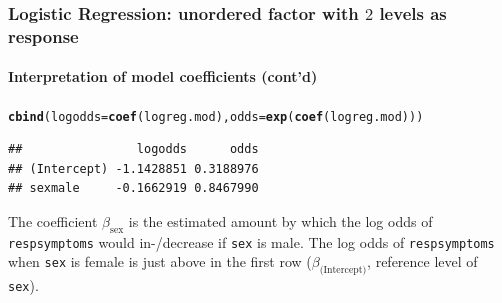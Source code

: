 \documentclass{beamer}\usepackage[]{graphicx}\usepackage[]{color}
\makeatletter
\newcommand{\hlstd}[1]{\textcolor[rgb]{0.345,0.345,0.345}{#1}}%
\newcommand{\hlkwc}[1]{\textcolor[rgb]{0.333,0.667,0.333}{#1}}%
\newcommand{\hlkwd}[1]{\textcolor[rgb]{0.737,0.353,0.396}{\textbf{#1}}}%
\newenvironment{kframe}{%
 \def\at@end@of@kframe{}%
 \ifinner\ifhmode%
  \def\at@end@of@kframe{\end{minipage}}%
  \begin{minipage}{\columnwidth}%
 \fi\fi%
 \def\FrameCommand##1{\hskip\@totalleftmargin \hskip-\fboxsep
 \colorbox{shadecolor}{##1}\hskip-\fboxsep
     \hskip-\linewidth \hskip-\@totalleftmargin \hskip\columnwidth}%
 \MakeFramed {\advance\hsize-\width
   \@totalleftmargin\z@ \linewidth\hsize
   \@setminipage}}%
 {\par\unskip\endMakeFramed%
 \at@end@of@kframe}
\newenvironment{knitrout}{}{} %
\makeatother
\begin{document}
{{{
\begin{frame}[fragile]
\frametitle{Logistic Regression: unordered factor with $2$ levels as response}
\framesubtitle{Interpretation of model coefficients (cont'd)}
\begin{knitrout}\tiny
{}\color{fgcolor}\begin{kframe}
\begin{alltt}
\hlkwd{cbind}\hlstd{(}\hlkwc{logodds} \hlstd{=} \hlkwd{coef}\hlstd{(logreg.mod),} \hlkwc{odds} \hlstd{=} \hlkwd{exp}\hlstd{(}\hlkwd{coef}\hlstd{(logreg.mod)))}
\end{alltt}
\begin{verbatim}
##                logodds      odds
## (Intercept) -1.1428851 0.3188976
## sexmale     -0.1662919 0.8467990
\end{verbatim}
\end{kframe}
\end{knitrout}
The coefficient $\beta_{\text{sex}}$ is the estimated amount by which the log
odds of \texttt{respsymptoms} would in-/decrease if \texttt{sex} is male.
The log odds of \texttt{respsymptoms} when \texttt{sex} is female is just
above in the first row ($\beta_{\text{(Intercept)}}$, reference level of
\texttt{sex}).
\end{frame}

}}}
\end{document}
